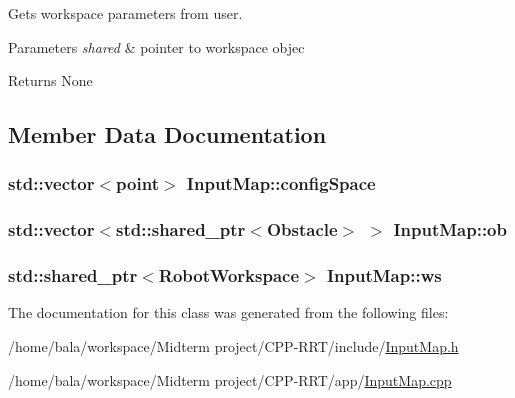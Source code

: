Gets workspace parameters from user. 


\begin{DoxyParams}{Parameters}
{\em shared} & pointer to workspace objec \\
\hline
\end{DoxyParams}
\begin{DoxyReturn}{Returns}
None 
\end{DoxyReturn}


\subsection{Member Data Documentation}
\subsubsection[{\texorpdfstring{config\+Space}{configSpace}}]{\setlength{\rightskip}{0pt plus 5cm}std\+::vector$<${\bf point}$>$ Input\+Map\+::config\+Space}\hypertarget{classInputMap_a2de100d8c53620d90aae543617a4e986}{}\label{classInputMap_a2de100d8c53620d90aae543617a4e986}
\subsubsection[{\texorpdfstring{ob}{ob}}]{\setlength{\rightskip}{0pt plus 5cm}std\+::vector$<$std\+::shared\+\_\+ptr$<${\bf Obstacle}$>$ $>$ Input\+Map\+::ob}\hypertarget{classInputMap_af0905398b4d3281f9876ff27350f9c3b}{}\label{classInputMap_af0905398b4d3281f9876ff27350f9c3b}
\subsubsection[{\texorpdfstring{ws}{ws}}]{\setlength{\rightskip}{0pt plus 5cm}std\+::shared\+\_\+ptr$<${\bf Robot\+Workspace}$>$ Input\+Map\+::ws}\hypertarget{classInputMap_aea6d53c88c8c0353dd7dc44fd295e256}{}\label{classInputMap_aea6d53c88c8c0353dd7dc44fd295e256}


The documentation for this class was generated from the following files\+:\begin{DoxyCompactItemize}
\item 
/home/bala/workspace/\+Midterm project/\+C\+P\+P-\/\+R\+R\+T/include/\hyperlink{InputMap_8h}{Input\+Map.\+h}\item 
/home/bala/workspace/\+Midterm project/\+C\+P\+P-\/\+R\+R\+T/app/\hyperlink{InputMap_8cpp}{Input\+Map.\+cpp}\end{DoxyCompactItemize}
